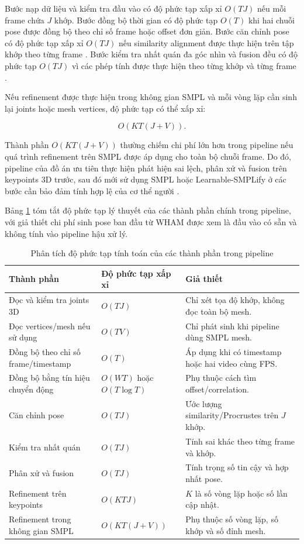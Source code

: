 \documentclass[../DoAn.tex]{subfiles}
\begin{document}
Bước nạp dữ liệu và kiểm tra đầu vào có độ phức tạp xấp xỉ $O(TJ)$ nếu mỗi frame chứa $J$ khớp. Bước đồng bộ thời gian có độ phức tạp $O(T)$ khi hai chuỗi pose được đồng bộ theo chỉ số frame hoặc offset đơn giản. Bước căn chỉnh pose có độ phức tạp xấp xỉ $O(TJ)$ nếu similarity alignment được thực hiện trên tập khớp theo từng frame \cite{gu2024multiview}. Bước kiểm tra nhất quán đa góc nhìn và fusion đều có độ phức tạp $O(TJ)$ vì các phép tính được thực hiện theo từng khớp và từng frame \cite{gu2024multiview,probtriangulation2023}.

Nếu refinement được thực hiện trong không gian SMPL và mỗi vòng lặp cần sinh lại joints hoặc mesh vertices, độ phức tạp có thể xấp xỉ:

\begin{equation}
O(KT(J+V)).
\end{equation}

Thành phần $O(KT(J+V))$ thường chiếm chi phí lớn hơn trong pipeline nếu quá trình refinement trên SMPL được áp dụng cho toàn bộ chuỗi frame. Do đó, pipeline của đồ án ưu tiên thực hiện phát hiện sai lệch, phân xử và fusion trên keypoints 3D trước, sau đó mới sử dụng SMPL hoặc Learnable-SMPLify ở các bước cần bảo đảm tính hợp lệ của cơ thể người \cite{smpl2015,smplify2016,yang2025learnable}.

Bảng \ref{tab:complexity_analysis} tóm tắt độ phức tạp lý thuyết của các thành phần chính trong pipeline, với giả thiết chi phí sinh pose ban đầu từ WHAM được xem là đầu vào có sẵn và không tính vào pipeline hậu xử lý.

\begin{table}[H]
\centering
\caption{Phân tích độ phức tạp tính toán của các thành phần trong pipeline}
\label{tab:complexity_analysis}
\begin{tabular}{|p{4.2cm}|p{4.2cm}|p{4.8cm}|}
\hline
\textbf{Thành phần} & \textbf{Độ phức tạp xấp xỉ} & \textbf{Giả thiết} \\
\hline
Đọc và kiểm tra joints 3D & $O(TJ)$ & Chỉ xét tọa độ khớp, không đọc toàn bộ mesh. \\
\hline
Đọc vertices/mesh nếu sử dụng & $O(TV)$ & Chỉ phát sinh khi pipeline dùng SMPL mesh. \\
\hline
Đồng bộ theo chỉ số frame/timestamp & $O(T)$ & Áp dụng khi có timestamp hoặc hai video cùng FPS. \\
\hline
Đồng bộ bằng tín hiệu chuyển động & $O(WT)$ hoặc $O(T \log T)$ & Phụ thuộc cách tìm offset/correlation. \\
\hline
Căn chỉnh pose & $O(TJ)$ & Ước lượng similarity/Procrustes trên $J$ khớp. \\
\hline
Kiểm tra nhất quán & $O(TJ)$ & Tính sai khác theo từng frame và khớp. \\
\hline
Phân xử và fusion & $O(TJ)$ & Tính trọng số tin cậy và hợp nhất pose. \\
\hline
Refinement trên keypoints & $O(KTJ)$ & $K$ là số vòng lặp hoặc số lần cập nhật. \\
\hline
Refinement trong không gian SMPL & $O(KT(J+V))$ & Phụ thuộc số vòng lặp, số khớp và số đỉnh mesh. \\
\hline
\end{tabular}
\end{table}
\end{document}

